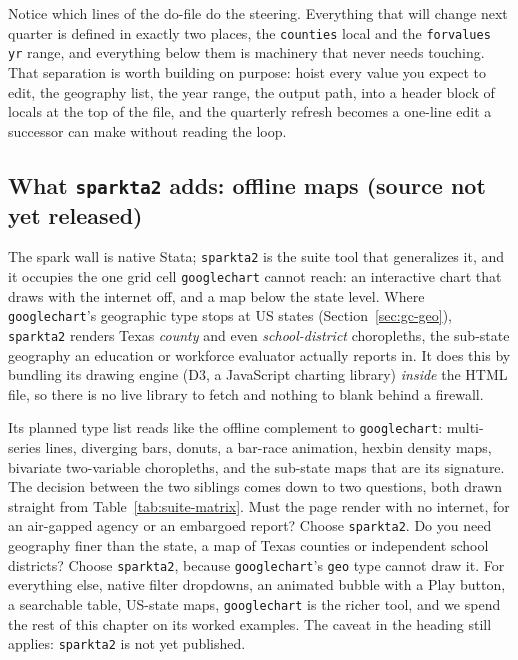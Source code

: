\documentclass[
    a4paper,
    fontsize=10pt,
    twoside=true,
    numbers=noenddot,
]{kaobook}
\begin{document}
Notice which lines of the do-file do the steering. Everything that will change next quarter is defined in exactly two places, the \texttt{counties} local and the \texttt{forvalues yr} range, and everything below them is machinery that never needs touching. That separation is worth building on purpose: hoist every value you expect to edit, the geography list, the year range, the output path, into a header block of locals at the top of the file, and the quarterly refresh becomes a one-line edit a successor can make without reading the loop.

\subsection{What \texttt{sparkta2} adds: offline maps (source not yet released)}\label{sec:sparkta2}
The spark wall is native Stata; \texttt{sparkta2} is the suite tool that generalizes it, and it occupies the one grid cell \texttt{googlechart} cannot reach: an interactive chart that draws with the internet off, and a map below the state level. Where \texttt{googlechart}'s geographic type stops at US states (Section~\ref{sec:gc-geo}), \texttt{sparkta2} renders Texas \emph{county} and even \emph{school-district} choropleths, the sub-state geography an education or workforce evaluator actually reports in. It does this by bundling its drawing engine (D3, a JavaScript charting library) \emph{inside} the HTML file, so there is no live library to fetch and nothing to blank behind a firewall.

Its planned type list reads like the offline complement to \texttt{googlechart}: multi-series lines, diverging bars, donuts, a bar-race animation, hexbin density maps, bivariate two-variable choropleths, and the sub-state maps that are its signature. The decision between the two siblings comes down to two questions, both drawn straight from Table~\ref{tab:suite-matrix}. Must the page render with no internet, for an air-gapped agency or an embargoed report? Choose \texttt{sparkta2}. Do you need geography finer than the state, a map of Texas counties or independent school districts? Choose \texttt{sparkta2}, because \texttt{googlechart}'s \texttt{geo} type cannot draw it. For everything else, native filter dropdowns, an animated bubble with a Play button, a searchable table, US-state maps, \texttt{googlechart} is the richer tool, and we spend the rest of this chapter on its worked examples. The caveat in the heading still applies: \texttt{sparkta2} is not yet published.
\end{document}
